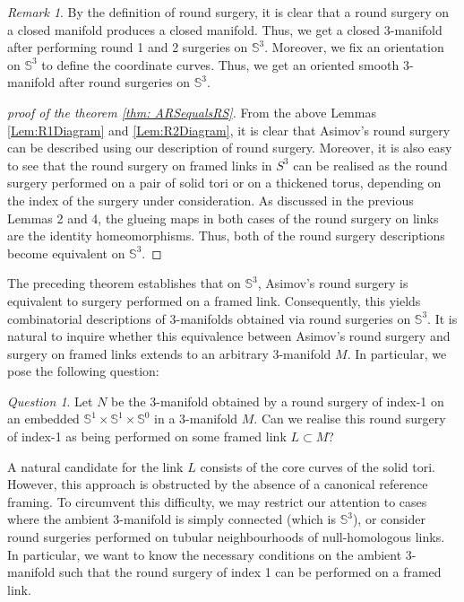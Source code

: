 \documentclass{amsart}
\theoremstyle{plain}
\theoremstyle{remark}
\newtheorem{rem}{Remark}
\newtheorem{ques}{Question}
\theoremstyle{definition}
\newcommand{\s}{\mathbb{S}}
\begin{document}
\begin{rem}
    By the definition of round surgery, it is clear that a round surgery on a closed manifold produces a closed manifold. Thus, we get a closed 3-manifold after performing round 1 and 2 surgeries on $\mathbb{S}^3$. Moreover, we fix an orientation on $\s^3$ to define the coordinate curves. Thus, we get an oriented smooth 3-manifold  after round surgeries on $\s^3$. 
\end{rem}


\begin{proof}[proof of the theorem \ref{thm: ARSequalsRS}]
   From the above Lemmas \ref{Lem:R1Diagram} and \ref{Lem:R2Diagram}, it is clear that Asimov's round surgery can be described using our description of round surgery. Moreover, it is also easy to see that the round surgery on framed links in $S^3$ can be realised as the round surgery performed on a pair of solid tori or on a thickened torus, depending on the index of the surgery under consideration. As discussed in the previous Lemmas 2 and 4, the glueing maps in both cases of the round surgery on links are the identity homeomorphisms. Thus, both of the round surgery descriptions become equivalent on $\s^3$.
\end{proof}

The preceding theorem establishes that on $\s^3$, Asimov's round surgery is equivalent to surgery performed on a framed link. Consequently, this yields combinatorial descriptions of 3-manifolds obtained via round surgeries on $\s^3$. It is natural to inquire whether this equivalence between Asimov's round surgery and surgery on framed links extends to an arbitrary 3-manifold $M$. In particular, we pose the following question:

\begin{ques}
    Let $N$ be the 3-manifold obtained by a round surgery of index-1 on an embedded $\s^1 \times \s^1 \times \s^0$ in a 3-manifold $M$. Can we realise this round surgery of index-1 as being performed on some framed link $L \subset M$?
\end{ques}


A natural candidate for the link $L$ consists of the core curves of the solid tori. However, this approach is obstructed by the absence of a canonical reference framing. To circumvent this difficulty, we may restrict our attention to cases where the ambient 3-manifold is simply connected (which is $\s^3$), or consider round surgeries performed on tubular neighbourhoods of null-homologous links. In particular, we want to know the necessary conditions on the ambient 3-manifold such that the round surgery of index 1 can be performed on a framed link.
\end{document}
